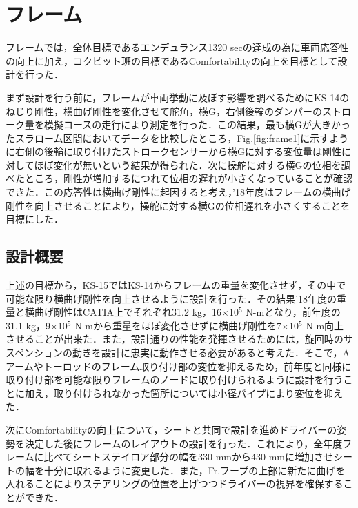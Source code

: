 \section{フレーム}
フレームでは，全体目標であるエンデュランス1320 secの達成の為に車両応答性の向上に加え，コクピット班の目標であるComfortabilityの向上を目標として設計を行った．

まず設計を行う前に，フレームが車両挙動に及ぼす影響を調べるためにKS-14のねじり剛性，横曲げ剛性を変化させて舵角，横G，右側後輪のダンパーのストローク量を模擬コースの走行により測定を行った．この結果，最も横Gが大きかったスラローム区間においてデータを比較したところ，Fig.\ref{fig:frame1}に示すように右側の後輪に取り付けたストロークセンサーから横Gに対する変位量は剛性に対してほぼ変化が無いという結果が得られた．次に操舵に対する横Gの位相を調べたところ，剛性が増加するにつれて位相の遅れが小さくなっていることが確認できた．この応答性は横曲げ剛性に起因すると考え，’18年度はフレームの横曲げ剛性を向上させることにより，操舵に対する横Gの位相遅れを小さくすることを目標にした．

\subsection{設計概要}
上述の目標から，KS-15ではKS-14からフレームの重量を変化させず，その中で可能な限り横曲げ剛性を向上させるように設計を行った．その結果’18年度の重量と横曲げ剛性はCATIA上でそれぞれ31.2 kg，16×10$^5$ N-mとなり，前年度の31.1 kg，9×10$^5$ N-mから重量をほぼ変化させずに横曲げ剛性を7×10$^5$ N-m向上させることが出来た．また，設計通りの性能を発揮させるためには，旋回時のサスペンションの動きを設計に忠実に動作させる必要があると考えた．そこで，Aアームやトーロッドのフレーム取り付け部の変位を抑えるため，前年度と同様に取り付け部を可能な限りフレームのノードに取り付けられるように設計を行うことに加え，取り付けられなかった箇所については小径パイプにより変位を抑えた．

次にComfortabilityの向上について，シートと共同で設計を進めドライバーの姿勢を決定した後にフレームのレイアウトの設計を行った．これにより，全年度フレームに比べてシートステイロア部分の幅を330 mmから430 mmに増加させシートの幅を十分に取れるように変更した．また，Fr.フープの上部に新たに曲げを入れることによりステアリングの位置を上げつつドライバーの視界を確保することができた．
